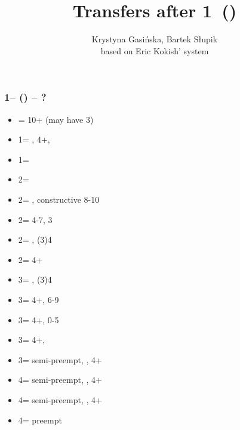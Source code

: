 \documentclass[12pt, a4paper]{article}
\title{Transfers after 1\major\ (\dbl)}
\author{Krystyna Gasińska, Bartek Słupik\\based on Eric Kokish' system}
\begin{document}
\maketitle


\subsubsection*{1\hearts -- (\dbl) -- ?}
\begin{itemize}
    \item \rdbl = 10+ (may have 3\hearts)
    \item 1\spades = \nat, 4+\spades, \fonce
    \item 1\nt = \trsf{2\clubs}
    \item 2\clubs = \trsf{2\diams}
    \item 2\diams = \trsf{2\hearts}, constructive 8-10
    \item 2\hearts = 4-7, 3\hearts
    \item 2\spades = \spades, (3)4\hearts \invp
    \item 2\nt = 4+\hearts \invp
    \item 3\clubs = \clubs, (3)4\hearts \invp
    \item 3\diams = 4+\hearts, 6-9
    \item 3\hearts = 4+\hearts, 0-5
    \item 3\spades = 4+\hearts, \lsf \vimp
    \item 3\nt = semi-preempt, \spades, 4+\hearts
    \item 4\clubs = semi-preempt, \clubs, 4+\hearts
    \item 4\diams = semi-preempt, \diams, 4+\hearts
    \item 4\hearts = preempt
\end{itemize}
\end{document}
